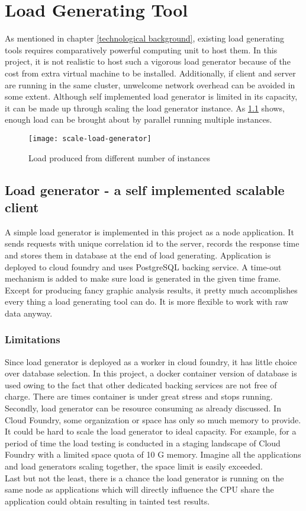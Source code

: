 \chapter{Load Generating Tool}
As mentioned in chapter \ref{technological background}, existing load generating tools requires comparatively powerful computing unit to host them. In this project, it is not realistic to host such a vigorous load generator because of the cost from extra virtual machine to be installed. Additionally, if client and server are running in the same cluster, unwelcome network overhead can be avoided in some extent. Although self implemented load generator is limited in its capacity, it can be made up through scaling the load generator instance. As \ref{scale-load-generator} shows, enough load can be brought about by parallel running multiple instances.
\begin{figure}[h]
	\centering
	\texttt{[image: scale-load-generator]}
	\caption{Load produced from different number of instances}
	\label{scale-load-generator}
\end{figure}

\section{Load generator - a self implemented scalable client}
A simple load generator is implemented in this project as a node application. It sends requests with unique correlation id to the server, records the response time and stores them in database at the end of load generating. Application is deployed to cloud foundry and uses PostgreSQL backing service. A time-out mechanism is added to make sure load is generated in the given time frame. Except for producing fancy graphic analysis results, it pretty much accomplishes every thing a load generating tool can do. It is more flexible to work with raw data anyway.
\subsection{Limitations}
Since load generator is deployed as a worker in cloud foundry, it has little choice over database selection. In this project, a docker container version of database is used owing to the fact that other dedicated backing services are not free of charge. There are times container is under great stress and stops running. \\
Secondly, load generator can be resource consuming as already discussed. In Cloud Foundry, some organization or space has only so much memory to provide. It could be hard to scale the load generator to ideal capacity. For example, for a period of time the load testing is conducted in a staging landscape of Cloud Foundry with a limited space quota of 10 G memory. Imagine all the applications and load generators scaling together, the space limit is easily exceeded. \\
Last but not the least, there is a chance the load generator is running on the same node as applications which will directly influence the CPU share the application could obtain resulting in tainted test results. 

